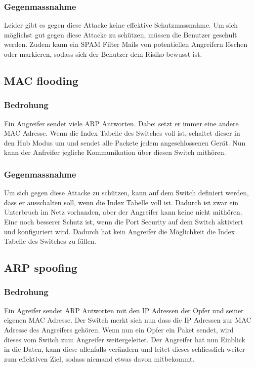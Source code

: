 \documentclass[11pt,a4paper,parskip=half]{scrartcl}
\begin{document}
\subsubsection{Gegenmassnahme}
Leider gibt es gegen diese Attacke keine effektive Schutzmassnahme. Um sich möglichst gut gegen diese Attacke zu schützen, müssen die Benutzer geschult werden. Zudem kann ein SPAM Filter Mails von potentiellen Angreifern löschen oder markieren, sodass sich der Benutzer dem Risiko bewusst ist.

\subsection{MAC flooding}
\subsubsection{Bedrohung}
Ein Angreifer sendet viele ARP Antworten. Dabei setzt er immer eine andere MAC Adresse. Wenn die Index Tabelle des Switches voll ist, schaltet dieser in den Hub Modus um und sendet alle Packete jedem angeschlossenen Gerät. Nun kann der Anfreifer jegliche Kommunikation über diesen Switch mithören. 
\subsubsection{Gegenmassnahme}
Um sich gegen diese Attacke zu schützen, kann auf dem Switch definiert werden, dass er ausschalten soll, wenn die Index Tabelle voll ist. Dadurch ist zwar ein Unterbruch im Netz vorhanden, aber der Angreifer kann keine nicht mithören.\\
Eine noch besserer Schutz ist, wenn die Port Security auf dem Switch aktiviert und konfiguriert wird. Dadurch hat kein Angreifer die Möglichkeit die Index Tabelle des Switches zu füllen.

\subsection{ARP spoofing}
\subsubsection{Bedrohung}
Ein Agreifer sendet ARP Antworten mit den IP Adressen der Opfer und seiner eigenen MAC Adresse. Der Switch merkt sich nun dass die IP Adressen zur MAC Adresse des Angreifers gehören. Wenn nun ein Opfer ein Paket sendet, wird dieses vom Switch zum Angreifer weitergeleitet. Der Angreifer hat nun Einblick in die Daten, kann diese allenfalls verändern und leitet dieses schliesslich weiter zum effektiven Ziel, sodass niemand etwas davon mitbekommt.
\end{document}
